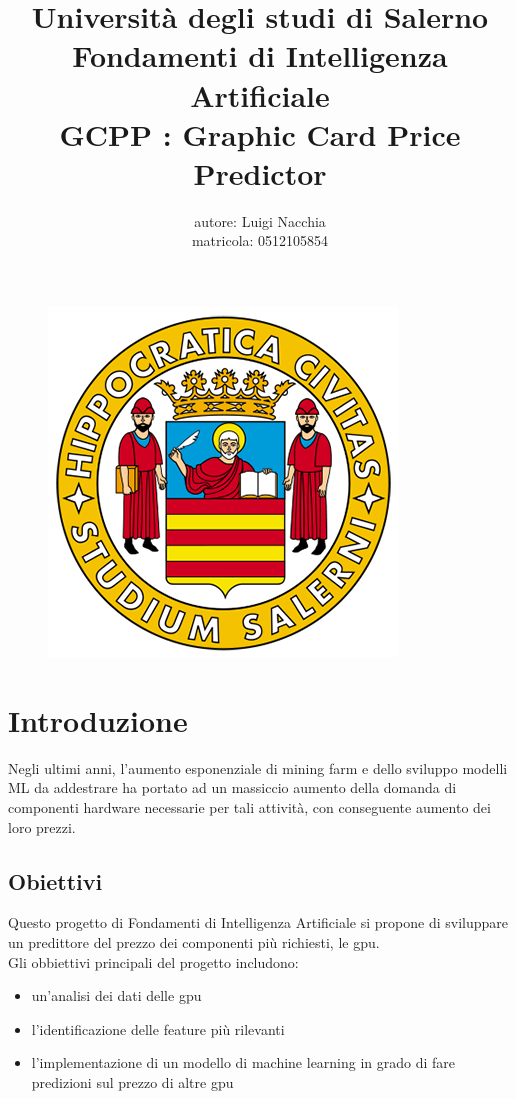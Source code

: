 \documentclass{article}
\title{Università degli studi di Salerno
        \\Fondamenti di Intelligenza Artificiale
        \\ GCPP : Graphic Card Price Predictor}
\author{autore: Luigi Nacchia\\matricola: 0512105854}
\date{}
\begin{document}
\begin{figure}
    \centering
    \includegraphics[width=0.95\linewidth]{logo_unisa.png}
\end{figure}

\maketitle

\newpage
\tableofcontents

\newpage
\section{Introduzione}
Negli ultimi anni, l'aumento esponenziale di mining farm e dello sviluppo modelli ML da addestrare ha portato ad un massiccio aumento della domanda di componenti hardware necessarie per tali attività, con conseguente aumento dei loro prezzi.

    \subsection{Obiettivi}
    Questo progetto di Fondamenti di Intelligenza Artificiale si propone di sviluppare un predittore del prezzo dei componenti più richiesti, le gpu.
    \\
    Gli obbiettivi principali del progetto includono:
    \begin{itemize}
        \item un'analisi dei dati delle gpu 
        \item l'identificazione delle feature più rilevanti
        \item l'implementazione di un modello di machine learning in grado di fare predizioni sul prezzo di altre gpu
    \end{itemize}
    
\end{document}
